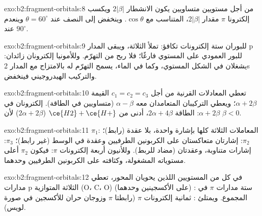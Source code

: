 \begin{solution}{exo:b2:fragment-orbitals:8}
من أجل مستويين متساويين يكون الانشطار $2|\beta|$ ويكسب إلكترونا $\pi$ مقدار $2|\beta|$،
المتناسب مع $\cos\theta$. وينخفض إلى النصف عند $\theta = 60^\circ$ وينعدم عند
$90^\circ$.
\end{solution}

\begin{solution}{exo:b2:fragment-orbitals:9}
للبوران ستة إلكترونات تكافؤ: تملأ  الثلاثة، ويبقى المدار p
للبور العمودي على المستوي فارغًا؛ فلا ربح من
التهرّم. وللأمونيا إلكترونان زائدان: يشغلان  في
الشكل المستوي، وكما في الماء، يسمح التهرّم له بالامتزاج مع المدار 2s 
والتركيب الهيدروجيني فينخفض.
\end{solution}

\begin{solution}{exo:b2:fragment-orbitals:10}
تعطي المعادلات القرنية من أجل $c_1 = c_2 = c_3$ القيمة $\alpha + 2\beta$؛ ويعطي التركيبان
المتعامدان معه $\alpha - \beta$ (متساويين في الطاقة). إلكترونان في $\alpha + 2\beta$: الطاقة
$2\alpha + 4\beta$، أدنى من $\ce{H2} + \ce{H+}$ ($2\alpha + 2\beta$) لأن $\beta < 0$.
\end{solution}

\begin{solution}{exo:b2:fragment-orbitals:11}
$\pi_1$: المعاملات الثلاثة كلها بإشارة واحدة، بلا عقدة (رابط)؛ $\pi_2$: إشارتان متعاكستان
على الكربونين الطرفيين وعقدة في الوسط (غير رابط)؛ $\pi_3$: إشارات
متناوبة، وعقدتان (مضاد للربط). وللأنيون أربعة إلكترونات $\pi$: فيكون $\pi_2$
أعلى مستوياته المشغولة، وكثافته على الكربونين الطرفيين وحدهما.
\end{solution}

\begin{solution}{exo:b2:fragment-orbitals:12}
في كل من المستويين اللذين يحويان المحور، تعطي مدارات p الثلاثة المتوازية (O، C، O)
  (على الأكسجينين وحدهما) : ستة
مدارات $\pi$ في المجموع. ويمتلئ  : ثمانية
إلكترونات $\pi$ (رابطتا $\pi$ وزوجان حران للأكسجين في صورة لويس).
\end{solution}


